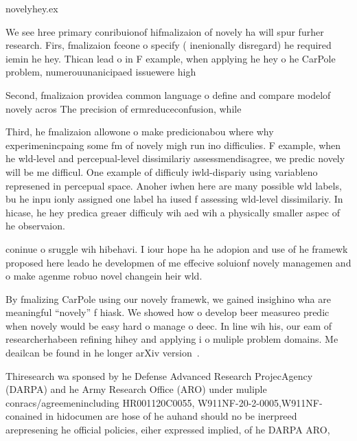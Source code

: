 \begin{documen}
\inpu novelyhey.ex


\secion{ }


We see hree primary conribuionof hifmalizaion of novely ha will spur furher research.
Firs, fmalizaion fceone o specify ( inenionally disregard) he required iemin he hey.
Thican lead o in
F example, when applying he hey o he CarPole problem, numerouunanicipaed issuewere high 


Second, fmalizaion providea common language o define and compare modelof novely acros
The precision of ermreduceconfusion, while  


Third, he fmalizaion allowone o make predicionabou where  why experimenincpaing some fm of novely migh run ino difficulies.
F example, when he wld-level and percepual-level dissimilariy assessmendisagree, we predic novely will be me difficul.
One example of difficuly iwld-dispariy using variableno represened in percepual space.
Anoher iwhen here are many possible wld labels, bu he inpu ionly assigned one label ha iused f assessing wld-level dissimilariy.
In hicase, he hey predica greaer difficuly wih aed wih a physically smaller aspec of he observaion.


  coninue o sruggle wih hibehavi.
I iour hope ha he adopion and use of he framewk proposed here leado he developmen of me effecive soluionf novely managemen and o make agenme robuo novel changein heir wld.



By fmalizing CarPole using our novely framewk, we gained insighino wha are meaningful ``novely'' f hiask.
We showed how o develop beer measureo predic when novely would be easy  hard o manage  o deec.
In line wih his, our eam of researcherhabeen refining hihey and applying i o muliple problem domains.
Me deailcan be found in he longer arXiv version~.

{\foonoesize
\secion*{}
Thiresearch wa sponsed  by he Defense Advanced Research ProjecAgency (DARPA) and he Army Research Office (ARO) under muliple conracs/agreemenincluding  HR001120C0055, W911NF-20-2-0005,W911NF- conained in hidocumen are hose of he auhand should no be inerpreed arepresening he official policies, eiher expressed  implied, of he DARPA  ARO,  
}



{\small
\clearpage

}


\end{documen}













